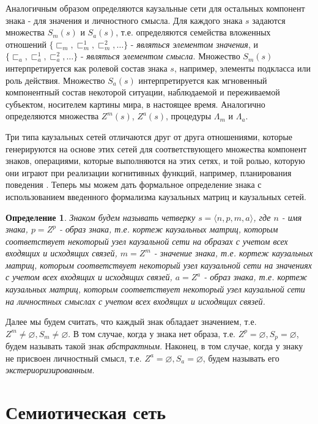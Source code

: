 \documentclass[12pt]{scrartcl}
\newtheorem{definition}{Определение}
\begin{document}
	Аналогичным образом определяются каузальные сети для остальных компонент знака - для значения и личностного смысла. Для каждого знака $s$ задаются множества $S_m(s)$ и $S_a(s)$, т.е. определяются семейства вложенных отношений $\{\sqsubset_m,\sqsubset_m^1,\sqsubset_m^2,\dots\}$ - \textit{являться элементом значения}, и $\{\sqsubset_a,\sqsubset_a^1,\sqsubset_a^2,\dots\}$ - \textit{являться элементом смысла}. Множество $S_m(s)$ интерпретируется как ролевой состав знака $s$, например, элементы подкласса или роль действия. Множество $S_a(s)$ интерпретируется как мгновенный компонентный состав некоторой ситуации, наблюдаемой и переживаемой субъектом, носителем картины мира, в настоящее время. Аналогично определяются множества $Z^m(s)$, $Z^a(s)$, процедуры $\Lambda_m$ и $\Lambda_a$.
	
	Три типа каузальных сетей отличаются друг от друга отношениями, которые генерируются на основе этих сетей для соответствующего множества компонент знаков, операциями, которые выполняются на этих сетях, и той ролью, которую они играют при реализации когнитивных функций, например, планирования поведения \cite{Osipov2015d}. Теперь мы можем дать формальное определение знака с использованием введенного формализма каузальных матриц и каузальных сетей.
	
	\begin{definition}
		Знаком будем называть четверку $s=\langle n, p, m, a \rangle$, где $n$ - имя знака, $p=Z^p$ - образ знака, т.е. кортеж каузальных матриц, которым соответствует некоторый узел каузальной сети на образах с учетом всех входящих и исходящих связей, $m=Z^m$ - значение знака, т.е. кортеж каузальных матриц, которым соответствует некоторый узел каузальной сети на значениях  с учетом всех входящих и исходящих связей, $a=Z^a$ - образ знака, т.е. кортеж каузальных матриц, которым соответствует некоторый узел каузальной сети на личностных смыслах  с учетом всех входящих и исходящих связей.
	\end{definition}
	
	Далее мы будем считать, что каждый знак обладает значением, т.е. $Z^m\not = \varnothing, S_m\not=\varnothing$. В том случае, когда у знака нет образа, т.е. $Z^p=\varnothing,S_p=\varnothing$, будем называть такой знак \textit{абстрактным}. Наконец, в том случае, когда у знаку не присвоен личностный смысл, т.е. $Z^a=\varnothing, S_a=\varnothing$, будем называть его \textit{экстериоризированным}.
	
	\section{Семиотическая сеть}
	
\end{document}
